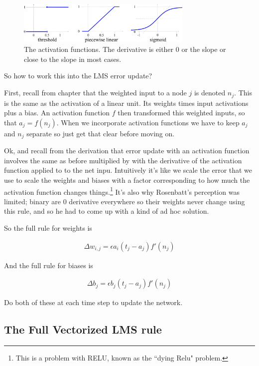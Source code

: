 \begin{figure}[h]
\centering
\includegraphics[width=0.75\textwidth]{images/graph_binary.pdf}
\caption[Jeff Yoshimi.]{The activation functions. The derivative is either 0 or the slope or close to the slope in most cases. }
\label{derivativesActFunctions}
\end{figure}

So how to work this into the LMS error update?

First, recall from chapter  that the weighted input to a node $j$ is denoted $n_j$. This is the same as the activation of a linear unit. Its weights times input activations plus a bias.  An activation function $f$ then transformed this weighted inputs, so that $a_j = f(n_j)$.  When we incorporate activation functions we have to keep $a_j$ and $n_j$ separate so just get that clear before moving on.

Ok, and recall from the derivation that error update with an activation function involves the same as before multiplied by with the derivative of the activation function applied to to the net inpu.  Intuitively it's like we scale the error that we use to scale the weights and biases with a factor corresponding to how much the activation function changes things.\footnote{This is a problem with RELU, known as the ``dying Relu" problem.}  It's also why Rosenbatt's perception was limited; binary are 0 derivative everywhere so their weights never change using this rule, and so he had to come up with a kind of ad hoc solution.

So  the full rule for weights is

\begin{eqnarray*}
\Delta w_{i,j}  =  \epsilon a_i (t_j - a_j) f' (n_j)
\end{eqnarray*}

And the full rule for biases is 

\begin{eqnarray*}
\Delta b_{j}  =  \epsilon b_j (t_j - a_j) f' (n_j)
\end{eqnarray*}

Do both of these at each time step to update the network.


\subsection{The Full Vectorized LMS rule}

